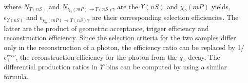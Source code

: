 \noindent where
${N_{\Upsilon(nS)}}$ and ${N_{\chi_b(mP)\to \Upsilon(nS) \gamma}}$ are the
$\Upsilon(nS)$ and $\chi_b(mP)$ yields, $\epsilon_{\Upsilon(nS)}$ and
$\epsilon_{\chi_b(mP)\to \Upsilon(nS) \gamma}$ are their corresponding selection
efficiencies. The latter are the product of geometric acceptance, trigger
efficiency and reconstruction efficiency. Since the selection criteria for the
two samples differ only in the reconstruction of a photon, the efficiency ratio
can be replaced by 1/$\epsilon^{reco}_{\gamma}$, the reconstruction efficiency for the
photon from the $\chi_b$ decay. The differential production ratios in $\Upsilon$ \pt bins 
can be computed by using a similar formula.  